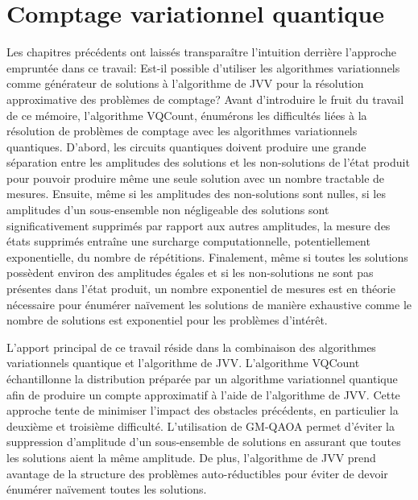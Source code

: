 \chapter{Comptage variationnel quantique}

Les chapitres précédents ont laissés transparaître l'intuition derrière l'approche empruntée dans ce travail: Est-il possible d'utiliser les algorithmes variationnels comme générateur de solutions à l'algorithme de JVV pour la résolution approximative des problèmes de comptage? Avant d'introduire le fruit du travail de ce mémoire, l'algorithme VQCount, énumérons les difficultés liées à la résolution de problèmes de comptage avec les algorithmes variationnels quantiques. D'abord, les circuits quantiques doivent produire une grande séparation entre les amplitudes des solutions et les non-solutions de l'état produit pour pouvoir produire même une seule solution avec un nombre tractable de mesures. Ensuite, même si les amplitudes des non-solutions sont nulles, si les amplitudes d'un sous-ensemble non négligeable des solutions sont significativement supprimés par rapport aux autres amplitudes, la mesure des états supprimés entraîne une surcharge computationnelle, potentiellement exponentielle, du nombre de répétitions. Finalement, même si toutes les solutions possèdent environ des amplitudes égales et si les non-solutions ne sont pas présentes dans l'état produit, un nombre exponentiel de mesures est en théorie nécessaire pour énumérer naïvement les solutions de manière exhaustive comme le nombre de solutions est exponentiel pour les problèmes d'intérêt.

L'apport principal de ce travail réside dans la combinaison des algorithmes variationnels quantique et l'algorithme de JVV. L'algorithme VQCount échantillonne la distribution préparée par un algorithme variationnel quantique afin de produire un compte approximatif à l'aide de l'algorithme de JVV. Cette approche tente de minimiser l'impact des obstacles précédents, en particulier la deuxième et troisième difficulté. L'utilisation de GM-QAOA permet d'éviter la suppression d'amplitude d'un sous-ensemble de solutions en assurant que toutes les solutions aient la même amplitude. De plus, l'algorithme de JVV prend avantage de la structure des problèmes auto-réductibles pour éviter de devoir énumérer naïvement toutes les solutions. 

